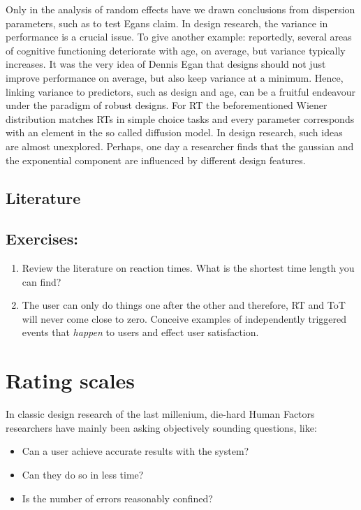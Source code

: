 \documentclass[]{svmono}
\providecommand{\tightlist}{%
  \setlength{\itemsep}{0pt}\setlength{\parskip}{0pt}}
\begin{document}
Only in the analysis of random effects have we drawn conclusions from
dispersion parameters, such as to test Egans claim. In design research,
the variance in performance is a crucial issue. To give another example:
reportedly, several areas of cognitive functioning deteriorate with age,
on average, but variance typically increases. It was the very idea of
Dennis Egan that designs should not just improve performance on average,
but also keep variance at a minimum. Hence, linking variance to
predictors, such as design and age, can be a fruitful endeavour under
the paradigm of robust designs. For RT the beforementioned Wiener
distribution matches RTs in simple choice tasks and every parameter
corresponds with an element in the so called diffusion model. In design
research, such ideas are almost unexplored. Perhaps, one day a
researcher finds that the gaussian and the exponential component are
influenced by different design features.

\subsection{Literature}\label{literature}

\subsection{Exercises:}\label{exercises-9}

\begin{enumerate}
\def\labelenumi{\arabic{enumi}.}
\item
  Review the literature on reaction times. What is the shortest time
  length you can find? 
\item
  The user can only do things one after the other and therefore, RT and
  ToT will never come close to zero. Conceive examples of independently
  triggered events that \emph{happen} to users and effect user
  satisfaction.
\end{enumerate}

\section{Rating scales}\label{rating-scales}

In classic design research of the last millenium, die-hard Human Factors
researchers have mainly been asking objectively sounding questions,
like:

\begin{itemize}
\tightlist
\item
  Can a user achieve accurate results with the system?
\item
  Can they do so in less time?
\item
  Is the number of errors reasonably confined?
\end{itemize}
\end{document}
